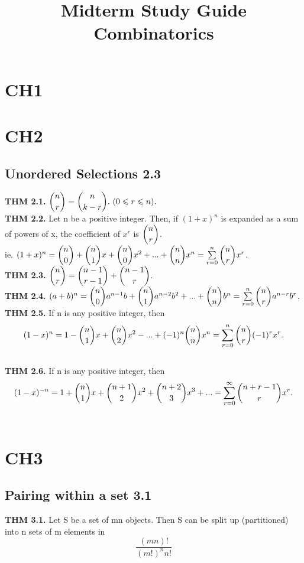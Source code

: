 \documentclass[12pt]{article}
\begin{document}
	\title{\vspace{-2.0cm}Midterm Study Guide Combinatorics}
	\maketitle
	
	\section{CH1}
	\section{CH2}
	\subsection{Unordered Selections 2.3}
	\textbf{THM 2.1.} $ \dbinom{n}{r} = \dbinom{n}{k-r} . \ ( 0 \leqslant r \leqslant n ). $ \\
	\textbf{THM 2.2.} Let n be a positive integer. Then, if $(1 + x)^n$ is expanded as a sum of powers of x, the coefficient of $x^r$ is $\dbinom{n}{r}$. \\
	ie. $(1 + x)^n = \dbinom{n}{0} + \dbinom{n}{1}x + \dbinom{n}{0}x^2 + ... + \dbinom{n}{n}x^n =  \sum\limits_{r=0}^{n}\dbinom{n}{r}x^r$. \\
	\textbf{THM 2.3.} $\dbinom{n}{r} = \dbinom{n-1}{r-1} + \dbinom{n-1}{r}$. \\
	\textbf{THM 2.4.} $(a+b)^n = \dbinom{n}{0}a^{n-1}b + \dbinom{n}{1}a^{n-2}b^2 + ... + \dbinom{n}{n}b^n = \sum\limits_{r=0}^{n}\dbinom{n}{r}a^{n-r}b^r$. \\ 
	\textbf{THM 2.5.} If n is any positive integer, then 
		\[ (1-x)^n  = 1 - \dbinom{n}{1}x + \dbinom{n}{2}x^2 - ... + (-1)^n\dbinom{n}{n}x^n = \sum\limits_{r=0}^n\dbinom{n}{r}(-1)^rx^r. \] \\
	\textbf{THM 2.6.} If n is any positive integer, then 
		\[ (1-x)^{-n}  = 1 + \dbinom{n}{1}x + \dbinom{n+1}{2}x^2 + \dbinom{n+2}{3}x^3 + ... = \sum\limits_{r=0}^{\infty}\dbinom{n+r-1}{r}x^r.\] \\ 
	\section{CH3}
	\subsection{Pairing within a set 3.1}
	\textbf{THM 3.1.} Let S be a set of mn objects. Then S can be split up (partitioned) into n sets of m elements in 
	\[ \frac{(mn)!}{(m!)^nn!} \]
	
\end{document}
